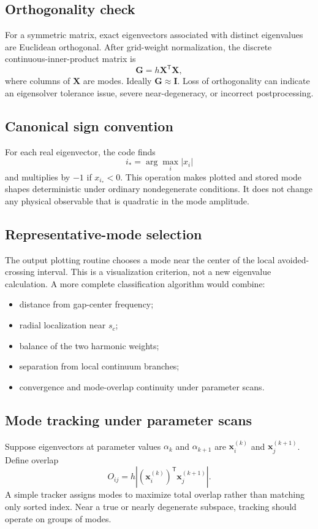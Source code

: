 \subsection{Orthogonality check}
For a symmetric matrix, exact eigenvectors associated with distinct eigenvalues are Euclidean orthogonal. After grid-weight normalization, the discrete continuous-inner-product matrix is
\begin{equation}
\mathbf G=h\mathbf X^{\mathsf T}\mathbf X,
\end{equation}
where columns of $\mathbf X$ are modes. Ideally $\mathbf G\approx\mathbf I$. Loss of orthogonality can indicate an eigensolver tolerance issue, severe near-degeneracy, or incorrect postprocessing.

\subsection{Canonical sign convention}
For each real eigenvector, the code finds
\begin{equation}
i_*=\arg\max_i|x_i|
\end{equation}
and multiplies by $-1$ if $x_{i_*}<0$. This operation makes plotted and stored mode shapes deterministic under ordinary nondegenerate conditions. It does not change any physical observable that is quadratic in the mode amplitude.

\subsection{Representative-mode selection}
The output plotting routine chooses a mode near the center of the local avoided-crossing interval. This is a visualization criterion, not a new eigenvalue calculation. A more complete classification algorithm would combine:
\begin{itemize}[leftmargin=1.6em]
\item distance from gap-center frequency;
\item radial localization near $s_c$;
\item balance of the two harmonic weights;
\item separation from local continuum branches;
\item convergence and mode-overlap continuity under parameter scans.
\end{itemize}

\subsection{Mode tracking under parameter scans}
Suppose eigenvectors at parameter values $\alpha_k$ and $\alpha_{k+1}$ are $\mathbf x_i^{(k)}$ and $\mathbf x_j^{(k+1)}$. Define overlap
\begin{equation}
O_{ij}=h\left|\left(\mathbf x_i^{(k)}\right)^{\mathsf T}\mathbf x_j^{(k+1)}\right|.
\end{equation}
A simple tracker assigns modes to maximize total overlap rather than matching only sorted index. Near a true or nearly degenerate subspace, tracking should operate on groups of modes.

